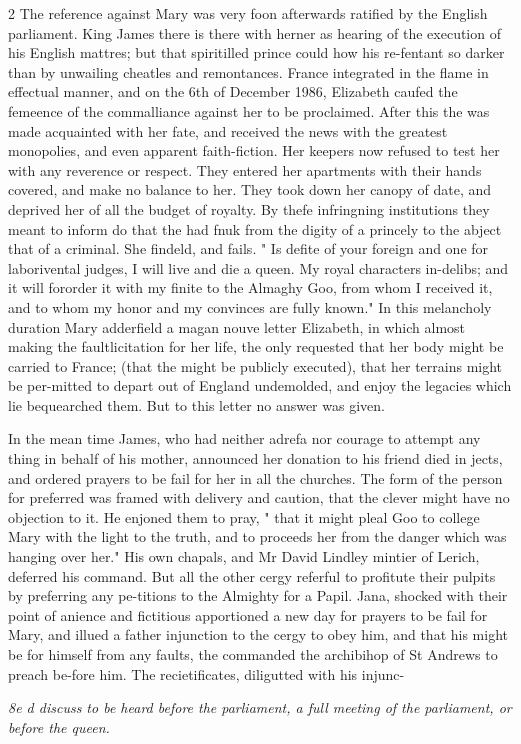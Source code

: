 \documentclass[10pt]{article}
\begin{document}
\begin{multicols}{2}
The reference against Mary was very foon afterwards ratified by the English parliament. King James there is there with herner as hearing of the execution of his English mattres; but that spiritilled prince could how his re-fentant so darker than by unwailing cheatles and remontances. France integrated in the flame in effectual manner, and on the 6th of December 1986, Elizabeth caufed the femeence of the commalliance against her to be proclaimed. After this the was made acquainted with her fate, and received the news with the greatest monopolies, and even apparent faith-fiction. Her keepers now refused to test her with any reverence or respect. They entered her apartments with their hands covered, and make no balance to her. They took down her canopy of date, and deprived her of all the budget of royalty. By thefe infringning institutions they meant to inform do that the had fnuk from the digity of a princely to the abject that of a criminal. She findeld, and fails. " Is defite of your foreign and one for laborivental judges, I will live and die a queen. My royal characters in-delibs; and it will fororder it with my finite to the Almaghy Goo, from whom I received it, and to whom my honor and my convinces are fully known." In this melancholy duration Mary adderfield a magan nouve letter Elizabeth, in which almost making the faultlicitation for her life, the only requested that her body might be carried to France; (that the might be publicly executed), that her terrains might be per-mitted to depart out of England undemolded, and enjoy the legacies which lie bequearched them. But to this letter no answer was given.

In the mean time James, who had neither adrefa nor courage to attempt any thing in behalf of his mother, announced her donation to his friend died in jects, and ordered prayers to be fail for her in all the churches. The form of the person for preferred was framed with delivery and caution, that the clever might have no objection to it. He enjoned them to pray, " that it might pleal Goo to college Mary with the light to the truth, and to proceeds her from the danger which was hanging over her." His own chapals, and Mr David Lindley mintier of Lerich, deferred his command. But all the other cergy referful to profitute their pulpits by preferring any pe-titions to the Almighty for a Papil. Jana, shocked with their point of anience and fictitious apportioned a new day for prayers to be fail for Mary, and illued a father injunction to the cergy to obey him, and that his might be for himself from any faults, the commanded the archibihop of St Andrews to preach be-fore him. The recietificates, diligutted with his injunc-

\begin{center}\small\itshape 8e d discuss to be heard before the parliament, a full meeting of the parliament, or before the queen.\end{center}
\end{multicols}
\end{document}
